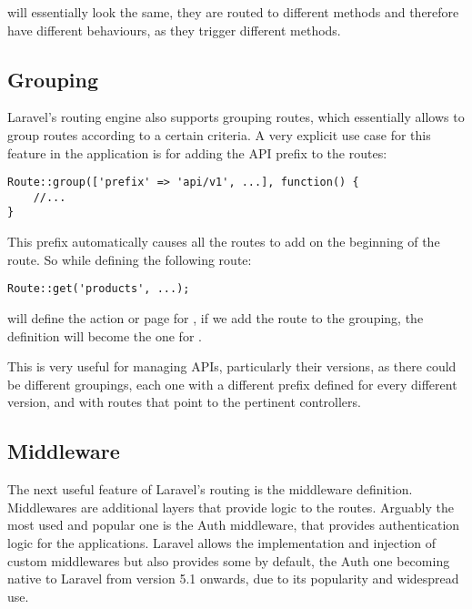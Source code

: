will essentially look the same, they are routed to different methods and therefore have different behaviours, as they trigger different methods.

\subsection{Grouping}
Laravel’s routing engine also supports grouping routes, which essentially allows to group routes according to a certain criteria. A very explicit use case for this feature in the application is for adding the API prefix to the routes:

\begin{verbatim}
Route::group(['prefix' => 'api/v1', ...], function() {
	//...
}
\end{verbatim}

This prefix automatically causes all the routes to add  on the beginning of the route. So while defining the following route:

\begin{verbatim}
Route::get('products', ...);
\end{verbatim}

will define the action or page for , if we add the route to the grouping, the definition will become the one for .

This is very useful for managing APIs, particularly their versions, as there could be different groupings, each one with a different prefix defined for every different version, and with routes that point to the pertinent controllers.

\subsection{Middleware}
The next useful feature of Laravel’s routing is the middleware definition. Middlewares are additional layers that provide logic to the routes. Arguably the most used and popular one is the Auth middleware, that provides authentication logic for the applications. Laravel allows the implementation and injection of custom middlewares but also provides some by default, the Auth one becoming native to Laravel from version 5.1 onwards, due to its popularity and widespread use.

